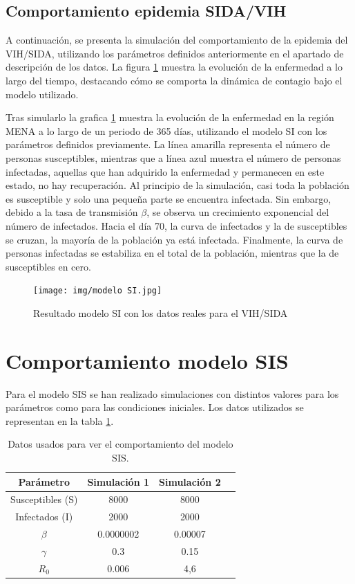  


\subsection{Comportamiento epidemia SIDA/VIH}
A continuación, se presenta la simulación del comportamiento de la epidemia del VIH/SIDA, utilizando los parámetros definidos anteriormente en el apartado de descripción de los datos. La figura \ref{fig:vih} muestra la evolución de la enfermedad a lo largo del tiempo, destacando cómo se comporta la dinámica de contagio bajo el modelo utilizado.

Tras simularlo la grafica \ref{fig:vih} muestra la evolución de la enfermedad en la región MENA a lo largo de un periodo de 365 días, utilizando el modelo SI con los parámetros definidos previamente.
La línea amarilla representa el número de personas susceptibles, mientras que a línea azul muestra el número de personas infectadas, aquellas que han adquirido la enfermedad y permanecen en este estado, no hay recuperación.
Al principio de la simulación, casi toda la población es susceptible y solo una pequeña parte se encuentra infectada. Sin embargo, debido a la tasa de transmisión $\beta$, se observa un crecimiento exponencial del número de infectados.
Hacia el día 70, la curva de infectados y la de susceptibles se cruzan, la mayoría de la población ya está infectada. Finalmente, la curva de personas infectadas se estabiliza en el total de la población, mientras que la de susceptibles en cero.

\begin{figure}[htbp]
    \centering
    \texttt{[image: img/modelo SI.jpg]}
    \caption{Resultado modelo SI con los datos reales para el VIH/SIDA}
    \label{fig:vih}
    
\end{figure}





\section{Comportamiento modelo SIS}
Para el modelo SIS se han realizado simulaciones con distintos
valores para los parámetros como para las condiciones iniciales. Los datos utilizados se representan en la tabla \ref{tab:datos para modelo SIS}.
\begin{table}[H]
\centering
\begin{tabular}{|c|c|c|c|}
\hline
\textbf{Parámetro} & \textbf{Simulación 1} & \textbf{Simulación 2}  \\
\hline
Susceptibles (S)  & 8000 & 8000\\
\hline
Infectados (I)      & 2000 & 2000  \\
\hline
\(\beta\)         & 0.0000002  & 0.00007\\
\hline
\(\gamma\)        & 0.3 & 0.15\\
\hline
$R_0$         &   0.006     &  4,6    \\
\hline
\end{tabular}
\caption{Datos usados para ver el comportamiento del modelo SIS.}
\label{tab:datos para modelo SIS}
\end{table}

